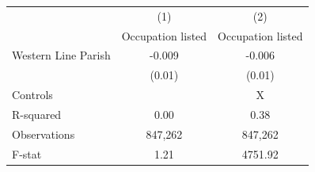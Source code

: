 {
\def\sym#1{\ifmmode^{#1}\else\(^{#1}\)\fi}
\begin{tabular}{l*{2}{c}}
\hline\hline
                    &\multicolumn{1}{c}{(1)}&\multicolumn{1}{c}{(2)}\\
                    &\multicolumn{1}{c}{Occupation listed}&\multicolumn{1}{c}{Occupation listed}\\
\hline
Western Line Parish &      -0.009         &      -0.006         \\
                    &      (0.01)         &      (0.01)         \\
\hline
Controls            &                     &           X         \\
R-squared           &        0.00         &        0.38         \\
Observations        &     847,262         &     847,262         \\
F-stat              &        1.21         &     4751.92         \\
\hline\hline
\end{tabular}
}
